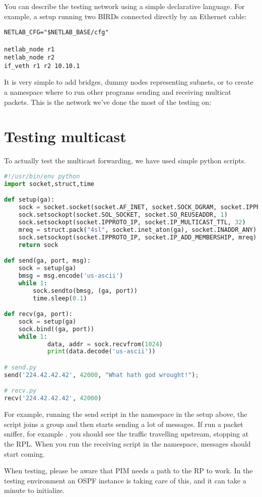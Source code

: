 You can describe the testing network using a simple declarative language. For
example, a setup running two BIRDs connected directly by an Ethernet cable:

\begin{lstlisting}
NETLAB_CFG="$NETLAB_BASE/cfg"

netlab_node r1
netlab_node r2
if_veth r1 r2 10.10.1
\end{lstlisting}

It is very simple to add bridges, dummy nodes representing subnets, or to
create a namespace where to run other programs sending and receiving multicat
packets. This is the network we've done the most of the testing on:

\vskip 10cm

\section{Testing multicast}
To actually test the multicast forwarding, we have used simple python scripts.

\begin{lstlisting}[language=python]
#!/usr/bin/env python
import socket,struct,time

def setup(ga):
    sock = socket.socket(socket.AF_INET, socket.SOCK_DGRAM, socket.IPPROTO_UDP)
    sock.setsockopt(socket.SOL_SOCKET, socket.SO_REUSEADDR, 1)
    sock.setsockopt(socket.IPPROTO_IP, socket.IP_MULTICAST_TTL, 32)
    mreq = struct.pack("4sl", socket.inet_aton(ga), socket.INADDR_ANY)
    sock.setsockopt(socket.IPPROTO_IP, socket.IP_ADD_MEMBERSHIP, mreq)
    return sock

def send(ga, port, msg):
    sock = setup(ga)
    bmsg = msg.encode('us-ascii')
    while 1:
        sock.sendto(bmsg, (ga, port))
        time.sleep(0.1)

def recv(ga, port):
    sock = setup(ga)
    sock.bind((ga, port))
    while 1:
            data, addr = sock.recvfrom(1024)
            print(data.decode('us-ascii'))

# send.py
send('224.42.42.42', 42000, "What hath god wrought!");

# recv.py
recv('224.42.42.42', 42000)
\end{lstlisting}

For example, running the send script in the  namespace in the setup
above, the script joins a group and then starts sending a lot of messages. If
run a packet sniffer, for example . you should see the traffic
travelling upstream, stopping at the RPL. When you run the receiving script in the  namespace, messages should start coming.

When testing, please be aware that PIM needs a path to the RP to work. In the
testing environment an OSPF instance is taking care of this, and it can take
a minute to initialize.
